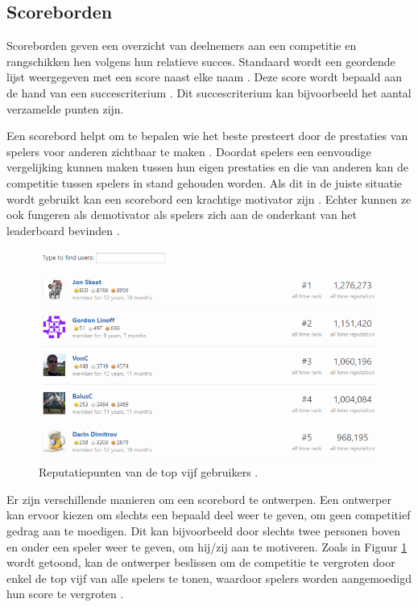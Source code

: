 \subsection{Scoreborden}

Scoreborden geven een overzicht van deelnemers aan een competitie \autocite{Costa2013} en rangschikken hen volgens hun relatieve succes. Standaard wordt een geordende lijst weergegeven met een score naast elke naam \autocite{Zichermann2011}. Deze score wordt bepaald aan de hand van een succescriterium \autocite{Sailer2016}. Dit succescriterium kan bijvoorbeeld het aantal verzamelde punten zijn.

Een scorebord helpt om te bepalen wie het beste presteert door de prestaties van spelers voor anderen zichtbaar te maken \autocite{Costa2019}. Doordat spelers een eenvoudige vergelijking kunnen maken tussen hun eigen prestaties en die van anderen \autocite{Zichermann2011} kan de competitie tussen spelers in stand gehouden worden. Als dit in de juiste situatie wordt gebruikt kan een scorebord een krachtige motivator zijn \autocite{Costa2019}. Echter kunnen ze ook fungeren als demotivator als spelers zich aan de onderkant van het leaderboard bevinden \autocite{Sailer2016}.

\begin{figure}
    \includegraphics[width=\linewidth]{Leaderboard.png}
    \caption{Reputatiepunten van de top vijf gebruikers \autocite{Leaderboard2021}.}
    \label{fig:leaderboard}
\end{figure}

Er zijn verschillende manieren om een scorebord te ontwerpen. Een ontwerper kan ervoor kiezen om slechts een bepaald deel weer te geven, om geen competitief gedrag aan te moedigen. Dit kan bijvoorbeeld door slechts twee personen boven en onder een speler weer te geven, om hij/zij aan te motiveren. Zoals in Figuur \ref{fig:leaderboard} wordt getoond, kan de ontwerper beslissen om de competitie te vergroten door enkel de top vijf van alle spelers te tonen, waardoor spelers worden aangemoedigd hun score te vergroten \autocite{Costa2019}.


